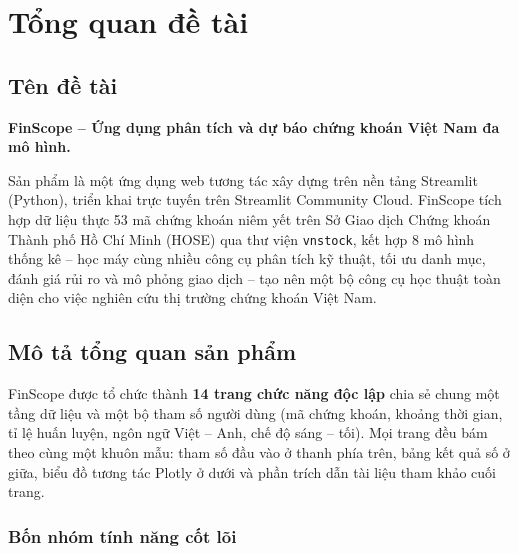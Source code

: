 \documentclass[12pt,a4paper,openany,oneside]{report}
\numberwithin{equation}{chapter}
\begin{document}
\chapter{Tổng quan đề tài}

\section{Tên đề tài}

\indent\textbf{FinScope -- Ứng dụng phân tích và dự báo chứng khoán
Việt Nam đa mô hình.}

\indent Sản phẩm là một ứng dụng web tương tác xây dựng trên nền tảng
Streamlit (Python), triển khai trực tuyến trên Streamlit Community
Cloud. FinScope tích hợp dữ liệu thực 53 mã chứng khoán niêm yết trên
Sở Giao dịch Chứng khoán Thành phố Hồ Chí Minh (HOSE) qua thư viện
\texttt{vnstock}, kết hợp 8 mô hình thống kê -- học máy cùng nhiều
công cụ phân tích kỹ thuật, tối ưu danh mục, đánh giá rủi ro và mô
phỏng giao dịch -- tạo nên một bộ công cụ học thuật toàn diện cho việc
nghiên cứu thị trường chứng khoán Việt Nam.

\section{Mô tả tổng quan sản phẩm}

\indent FinScope được tổ chức thành \textbf{14 trang chức năng độc
lập} chia sẻ chung một tầng dữ liệu và một bộ tham số người dùng
(mã chứng khoán, khoảng thời gian, tỉ lệ huấn luyện, ngôn ngữ
Việt -- Anh, chế độ sáng -- tối). Mọi trang đều bám theo cùng một
khuôn mẫu: tham số đầu vào ở thanh phía trên, bảng kết quả số ở giữa,
biểu đồ tương tác Plotly ở dưới và phần trích dẫn tài liệu tham khảo
cuối trang.

\subsection{Bốn nhóm tính năng cốt lõi}
\end{document}
